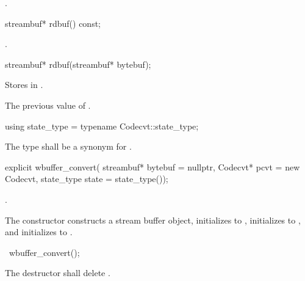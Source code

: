 \begin{itemdescr}
\pnum
\returns {}.
\end{itemdescr}

%
\begin{itemdecl}
streambuf* rdbuf() const;
\end{itemdecl}

\begin{itemdescr}
\pnum
\returns {}.
\end{itemdescr}

%
\begin{itemdecl}
streambuf* rdbuf(streambuf* bytebuf);
\end{itemdecl}

\begin{itemdescr}
\pnum
\effects Stores  in .

\pnum
\returns The previous value of .
\end{itemdescr}

%
\begin{itemdecl}
using state_type = typename Codecvt::state_type;
\end{itemdecl}

\begin{itemdescr}
\pnum
The type shall be a synonym for .
\end{itemdescr}

%
\begin{itemdecl}
explicit wbuffer_convert(
    streambuf* bytebuf = nullptr,
    Codecvt* pcvt = new Codecvt,
    state_type state = state_type());
\end{itemdecl}

\begin{itemdescr}
\pnum
\requires
{}.

\pnum
\effects The constructor constructs a stream buffer object, initializes
 to , initializes 
to , and initializes  to .
\end{itemdescr}

%
\begin{itemdecl}
~wbuffer_convert();
\end{itemdecl}

\begin{itemdescr}
\pnum
\effects The destructor shall delete .
\end{itemdescr}
